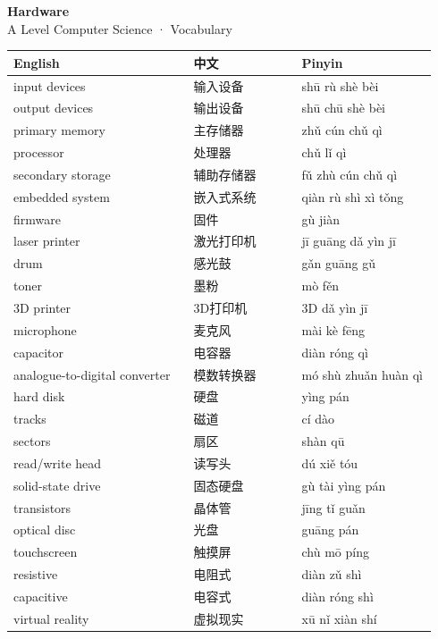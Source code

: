 \documentclass[11pt]{article}
\begin{document}
\begin{center}
  {\LARGE\bfseries Hardware}\\[0.35em]
  {\large A Level Computer Science · Vocabulary}
\end{center}
\vspace{0.6em}

\begin{longtable}{@{}p{0.40\linewidth}p{0.24\linewidth}p{0.30\linewidth}@{}}
\toprule
\textbf{English} & \textbf{中文} & \textbf{Pinyin} \\
\midrule
\endhead
\bottomrule
\endlastfoot
input devices & 输入设备 & shū rù shè bèi \\
output devices & 输出设备 & shū chū shè bèi \\
primary memory & 主存储器 & zhǔ cún chǔ qì \\
processor & 处理器 & chǔ lǐ qì \\
secondary storage & 辅助存储器 & fǔ zhù cún chǔ qì \\
embedded system & 嵌入式系统 & qiàn rù shì xì tǒng \\
firmware & 固件 & gù jiàn \\
laser printer & 激光打印机 & jī guāng dǎ yìn jī \\
drum & 感光鼓 & gǎn guāng gǔ \\
toner & 墨粉 & mò fěn \\
3D printer & 3D打印机 & 3D dǎ yìn jī \\
microphone & 麦克风 & mài kè fēng \\
capacitor & 电容器 & diàn róng qì \\
analogue-to-digital converter & 模数转换器 & mó shù zhuǎn huàn qì \\
hard disk & 硬盘 & yìng pán \\
tracks & 磁道 & cí dào \\
sectors & 扇区 & shàn qū \\
read/write head & 读写头 & dú xiě tóu \\
solid-state drive & 固态硬盘 & gù tài yìng pán \\
transistors & 晶体管 & jīng tǐ guǎn \\
optical disc & 光盘 & guāng pán \\
touchscreen & 触摸屏 & chù mō píng \\
resistive & 电阻式 & diàn zǔ shì \\
capacitive & 电容式 & diàn róng shì \\
virtual reality & 虚拟现实 & xū nǐ xiàn shí \\

\end{longtable}
\end{document}
